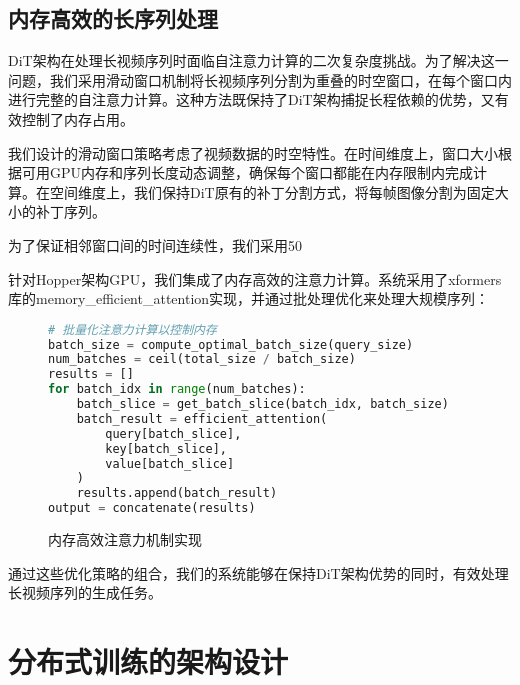 \subsection{内存高效的长序列处理}

DiT架构在处理长视频序列时面临自注意力计算的二次复杂度挑战。为了解决这一问题，我们采用滑动窗口机制将长视频序列分割为重叠的时空窗口，在每个窗口内进行完整的自注意力计算。这种方法既保持了DiT架构捕捉长程依赖的优势，又有效控制了内存占用。

我们设计的滑动窗口策略考虑了视频数据的时空特性。在时间维度上，窗口大小根据可用GPU内存和序列长度动态调整，确保每个窗口都能在内存限制内完成计算。在空间维度上，我们保持DiT原有的补丁分割方式，将每帧图像分割为固定大小的补丁序列。

为了保证相邻窗口间的时间连续性，我们采用50%

针对Hopper架构GPU，我们集成了内存高效的注意力计算。系统采用了xformers库的memory\_efficient\_attention实现，并通过批处理优化来处理大规模序列：

\begin{figure}[!b]
  \begin{tmpbox}
    \begin{lstlisting}[language=Python]
# 批量化注意力计算以控制内存
batch_size = compute_optimal_batch_size(query_size)
num_batches = ceil(total_size / batch_size)
results = []
for batch_idx in range(num_batches):
    batch_slice = get_batch_slice(batch_idx, batch_size)
    batch_result = efficient_attention(
        query[batch_slice], 
        key[batch_slice], 
        value[batch_slice]
    )
    results.append(batch_result)
output = concatenate(results)
\end{lstlisting}
  \end{tmpbox}
  \caption{内存高效注意力机制实现}
  \label{fig:attention-code}
\end{figure}

通过这些优化策略的组合，我们的系统能够在保持DiT架构优势的同时，有效处理长视频序列的生成任务。

\section{分布式训练的架构设计}

